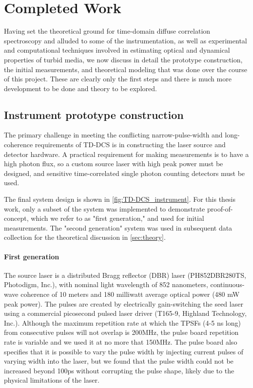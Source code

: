%
%

\chapter{Completed Work} \label{sec:Chapter2}

Having set the theoretical ground for time-domain diffuse correlation spectroscopy and alluded to some of the instrumentation, as well as experimental and computational techniques involved in estimating optical and dynamical properties of turbid media, we now discuss in detail the prototype construction, the initial measurements, and theoretical modeling that was done over the course of this project. These are clearly only the first steps and there is much more development to be done and theory to be explored. 

\section{Instrument prototype construction} \label{sec:prototype_construction}
The primary challenge in meeting the conflicting narrow-pulse-width and long-coherence requirements of TD-DCS is in constructing the laser source and detector hardware. A practical requirement for making measurements is to have a high photon flux, so a custom source laser with high peak power must be designed, and sensitive time-correlated single photon counting detectors must be used. 

The final system design is shown in \autoref{fig:TD-DCS_instrument}. For this thesis work, only a subset of the system was implemented to demonstrate proof-of-concept, which we refer to as "first generation," and used for initial measurements. The "second generation" system was used in subsequent data collection for the theoretical discussion in \autoref{sec:theory}.

\subsubsection{First generation}
The source laser is a distributed Bragg reflector (DBR) laser (PH852DBR280TS, Photodigm, Inc.), with nominal light wavelength of 852 nanometers, continuous-wave coherence of 10 meters and 180 milliwatt average optical power (480 mW peak power). The pulses are created by electrically gain-switching the seed laser using a commercial picosecond pulsed laser driver (T165-9, Highland Technology, Inc.). Although the maximum repetition rate at which the TPSFs (4-5 ns long) from consecutive pulses will not overlap is 200MHz, the pulse board repetition rate is variable and we used it at no more that 150MHz. The pulse board also specifies that it is possible to vary the pulse width by injecting current pulses of varying width into the laser, but we found that the pulse width could not be increased beyond 100ps without corrupting the pulse shape, likely due to the physical limitations of the laser. 

